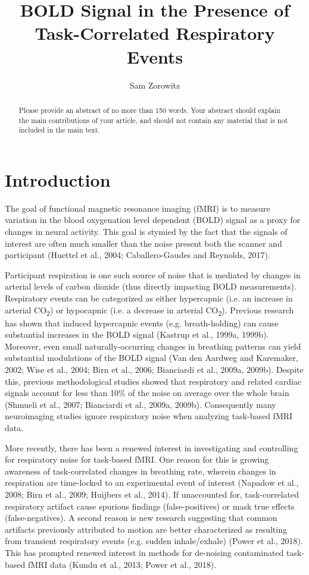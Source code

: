 \documentclass[9pt]{NEU502b-fmri}
\title{BOLD Signal in the Presence of Task-Correlated Respiratory Events}
\author[1]{Sam Zorowitz}
\begin{document}
\maketitle

\begin{abstract}
Please provide an abstract of no more than 150 words. Your abstract should explain the main contributions of your article, and should not contain any material that is not included in the main text.
\end{abstract}


\section{Introduction}

The goal of functional magnetic resonance imaging (fMRI) is to measure variation in the blood oxygenation level dependent (BOLD) signal as a proxy for changes in neural activity. This goal is stymied by the fact that the signals of interest are often much smaller than the noise present both the scanner and participant (Huettel et al., 2004; Caballero-Gaudes and Reynolds, 2017). 

Participant respiration is one such source of noise that is mediated by changes in arterial levels of carbon dioxide (thus directly impacting BOLD measurements). Respiratory events can be categorized as either hypercapnic (i.e. an increase in arterial CO\textsubscript{2}) or hypocapnic (i.e. a decrease in arterial CO\textsubscript{2}). Previous research has shown that induced hypercapnic events (e.g. breath-holding) can cause substantial increases in the BOLD signal (Kastrup et al., 1999a, 1999b). Moreover, even small naturally-occurring changes in breathing patterns can yield substantial modulations of the BOLD signal (Van den Aardweg and Karemaker, 2002; Wise et al., 2004; Birn et al., 2006; Bianciardi et al., 2009a, 2009b). Despite this, previous methodological studies showed that respiratory and related cardiac signals account for less than 10\% of the noise on average over the whole brain (Shmueli et al., 2007; Bianciardi et al., 2009a, 2009b). Consequently many neuroimaging studies ignore respiratory noise when analyzing task-based fMRI data.

More recently, there has been a renewed interest in investigating and controlling for respiratory noise for task-based fMRI. One reason for this is growing awareness of task-correlated changes in breathing rate, wherein changes in respiration are time-locked to an experimental event of interest (Napadow et al., 2008; Birn et al., 2009; Huijbers et al., 2014). If unaccounted for, task-correlated respiratory artifact cause spurious findings (false-positives) or mask true effects (false-negatives). A second reason is new research suggesting that common artifacts previously attributed to motion are better characterized as resulting from transient respiratory events (e.g. sudden inhale/exhale) (Power et al., 2018). This has prompted renewed interest in methods for de-noising contaminated task-based fMRI data (Kundu et al., 2013; Power et al., 2018). 
\end{document}
